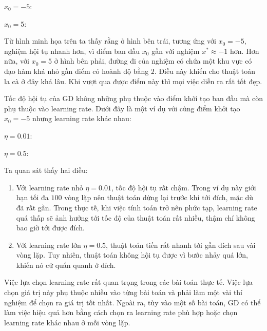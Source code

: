 $x_0 = -5$:

$x_0 = 5$:

\begin{ynghia}[title={So sánh hai điểm khởi tạo}]
Từ hình minh họa trên ta thấy rằng ở hình bên trái, tương ứng với $x_0 = -5$, nghiệm hội tụ nhanh hơn, vì điểm ban đầu $x_0$ gần với nghiệm $x^* \approx -1$ hơn. Hơn nữa, với $x_0 = 5$ ở hình bên phải, đường đi của nghiệm có chứa một khu vực có đạo hàm khá nhỏ gần điểm có hoành độ bằng $2$. Điều này khiến cho thuật toán la cà ở đây khá lâu. Khi vượt qua được điểm này thì mọi việc diễn ra rất tốt đẹp.
\end{ynghia}

\begin{vidu}[title={Learning rate khác nhau: Cùng $x_0 = -5$, $\eta$ khác nhau}]
Tốc độ hội tụ của GD không những phụ thuộc vào điểm khởi tạo ban đầu mà còn phụ thuộc vào learning rate. Dưới đây là một ví dụ với cùng điểm khởi tạo $x_0 = -5$ nhưng learning rate khác nhau:

$\eta = 0.01$:

$\eta = 0.5$:
\end{vidu}

\begin{tinhchat}[title={Hai trường hợp learning rate}]
Ta quan sát thấy hai điều:
\begin{enumerate}
 \item Với learning rate nhỏ $\eta = 0.01$, tốc độ hội tụ rất chậm. Trong ví dụ này giới hạn tối đa $100$ vòng lặp nên thuật toán dừng lại trước khi tới đích, mặc dù đã rất gần. Trong thực tế, khi việc tính toán trở nên phức tạp, learning rate quá thấp sẽ ảnh hưởng tới tốc độ của thuật toán rất nhiều, thậm chí không bao giờ tới được đích.
 \item Với learning rate lớn $\eta = 0.5$, thuật toán tiến rất nhanh tới gần đích sau vài vòng lặp. Tuy nhiên, thuật toán không hội tụ được vì bước nhảy quá lớn, khiến nó cứ quẩn quanh ở đích.
\end{enumerate}
\end{tinhchat}

\begin{luuy}[title={Chọn learning rate}]
Việc lựa chọn learning rate rất quan trọng trong các bài toán thực tế. Việc lựa chọn giá trị này phụ thuộc nhiều vào từng bài toán và phải làm một vài thí nghiệm để chọn ra giá trị tốt nhất. Ngoài ra, tùy vào một số bài toán, GD có thể làm việc hiệu quả hơn bằng cách chọn ra learning rate phù hợp hoặc chọn learning rate khác nhau ở mỗi vòng lặp.
\end{luuy}

